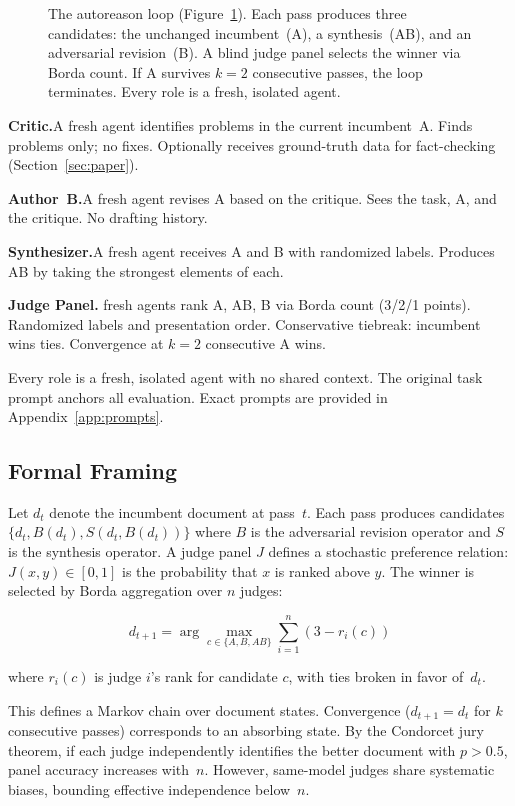 \documentclass[10pt,twocolumn]{article}
\begin{document}
\begin{figure}[t]
\begin{tikzpicture}
\end{tikzpicture}
\caption{The autoreason loop (Figure~\ref{fig:method}). Each pass produces three candidates: the unchanged incumbent~(A), a synthesis~(AB), and an adversarial revision~(B). A blind judge panel selects the winner via Borda count. If A survives $k{=}2$ consecutive passes, the loop terminates. Every role is a fresh, isolated agent.}
\label{fig:method}
\end{figure}

\textbf{Critic.}\enspace A fresh agent identifies problems in the current incumbent~A. Finds problems only; no fixes. Optionally receives ground-truth data for fact-checking (Section~\ref{sec:paper}).

\textbf{Author~B.}\enspace A fresh agent revises A based on the critique. Sees the task, A, and the critique. No drafting history.

\textbf{Synthesizer.}\enspace A fresh agent receives A and B with randomized labels. Produces AB by taking the strongest elements of each.

\textbf{Judge Panel.} fresh agents rank A, AB, B via Borda count (3/2/1 points). Randomized labels and presentation order. Conservative tiebreak: incumbent wins ties. Convergence at $k{=}2$ consecutive A wins.

Every role is a fresh, isolated agent with no shared context. The original task prompt anchors all evaluation. Exact prompts are provided in Appendix~\ref{app:prompts}.

\subsection{Formal Framing}

Let $d_t$ denote the incumbent document at pass~$t$. Each pass produces candidates $\{d_t, B(d_t), S(d_t, B(d_t))\}$ where $B$ is the adversarial revision operator and $S$ is the synthesis operator. A judge panel $J$ defines a stochastic preference relation: $J(x, y) \in [0,1]$ is the probability that $x$ is ranked above $y$. The winner is selected by Borda aggregation over $n$ judges:

$$d_{t+1} = \arg\max_{c \in \{A, B, AB\}} \sum_{i=1}^{n} (3 - r_i(c))$$

where $r_i(c)$ is judge $i$'s rank for candidate $c$, with ties broken in favor of~$d_t$.

This defines a Markov chain over document states. Convergence ($d_{t+1} = d_t$ for $k$ consecutive passes) corresponds to an absorbing state. By the Condorcet jury theorem, if each judge independently identifies the better document with $p > 0.5$, panel accuracy increases with~$n$. However, same-model judges share systematic biases, bounding effective independence below~$n$.
\end{document}
